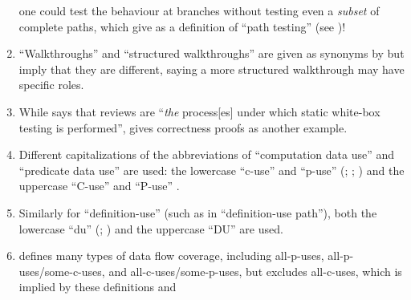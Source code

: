 \begin{enumerate}
          one could test the behaviour at branches without testing even a
          \emph{subset} of complete paths, which \citet[p.~316]{IEEE2017} give
          as a definition of ``path testing'' (see )!
    \item %
          ``Walkthroughs'' and ``structured walkthroughs'' are given
          as synonyms by \citetISTQB{} but \citet[p.~484]{PetersAndPedrycz2000}
          imply that they are different, saying a
          more structured walkthrough may have specific roles.
    \item %
          While \citet[p.~92\ifnotpaper, emphasis added\fi]{Patton2006}
          says that reviews are ``\emph{the} process[es] under which static
          white-box testing is performed'', \citet[pp.~418\==419]{vanVliet2000}
          gives correctness proofs as another example.
    \item %
          Different capitalizations of the abbreviations of ``computation data
          use'' and ``predicate data use'' are used: the lowercase ``\acs{c-use}''
          and ``\acs{p-use}'' (\citealp[pp.~3, 27\==29, 35\==36, 114\==155,
              117\==118, 129]{IEEE2021c}; \citeyear[p.~124]{IEEE2017};
          \citealp[p.~477, Tab.~12.6]{PetersAndPedrycz2000}) and the uppercase
          ``C-use'' and ``P-use'' \citep[pp.~424\==425]{vanVliet2000}.
    \item %
          Similarly for ``definition-use'' (such as in ``definition-use
          path''), both the lowercase ``du'' (\citealp[pp.~3, 27, 29, 35,
              119\==121, 129]{IEEE2021c}; \citealp[pp.~478\==479]{
              PetersAndPedrycz2000}) and the uppercase ``DU''
          \citep[p.~425]{vanVliet2000} are used.
    \item %
           defines many types of data
          flow coverage, including all-\acsp{p-use},
          all-\acsp{p-use}/some-\acsp{c-use}, and
          all-\acsp{c-use}/some-\acsp{p-use}, but
          excludes all-\acsp{c-use}, which is implied by these definitions and

\end{enumerate}
